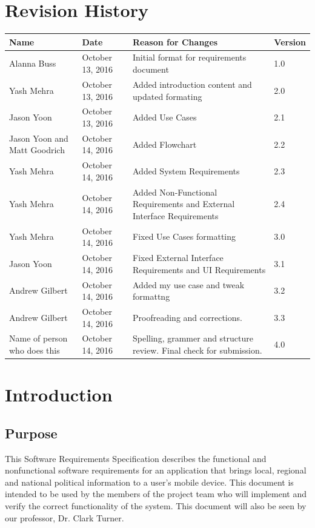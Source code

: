 \documentclass[12pt,oneside,letterpaper]{article}
\begin{document}
\section*{Revision History}
\begin{tabu}{|X[L.5]|l|X|l|}
\hline
\textbf{Name}&\textbf{Date}&\textbf{Reason for Changes}&\textbf{Version} \\
\hline
Alanna Buss & October 13, 2016 & Initial format for requirements document & 1.0 \\
\hline
Yash Mehra & October 13, 2016 & Added introduction content and updated formating & 2.0 \\
\hline
Jason Yoon & October 13, 2016 & Added Use Cases & 2.1 \\
\hline
Jason Yoon and Matt Goodrich & October 14, 2016 & Added Flowchart & 2.2 \\
\hline
Yash Mehra & October 14, 2016 & Added System Requirements & 2.3 \\ 
\hline
Yash Mehra & October 14, 2016 & Added Non-Functional Requirements and External Interface Requirements & 2.4 \\
\hline
Yash Mehra & October 14, 2016 & Fixed Use Cases formatting & 3.0 \\
\hline
Jason Yoon & October 14, 2016 & Fixed External Interface Requirements and UI Requirements& 3.1 \\
\hline
Andrew Gilbert & October 14, 2016 & Added my use case and tweak formattng & 3.2 \\
\hline
Andrew Gilbert & October 14, 2016 & Proofreading and corrections. & 3.3\\
\hline
Name of person who does this & October 14, 2016 & Spelling, grammer and structure review. Final check for submission. & 4.0 \\
\hline
\end{tabu}

\newpage

\section{Introduction}
\subsection{Purpose}
This Software Requirements Specification describes the functional and nonfunctional software requirements for an application that brings local, regional and national political information to a user's mobile device.  This document is intended to be used by the members of the project team who will implement and verify the correct functionality of the system. This document will also be seen by our professor, Dr. Clark Turner.
\end{document}
